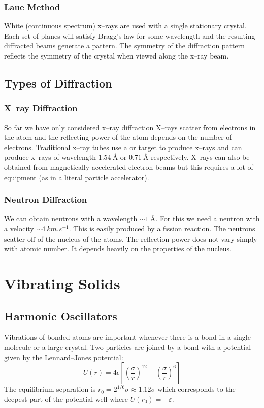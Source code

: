     \subsubsection{Laue Method}
    White (continuous spectrum) x--rays are used with a single stationary crystal.
    Each set of planes will satisfy Bragg's law for some wavelength and the resulting diffracted beams generate a pattern.
    The symmetry of the diffraction pattern reflects the symmetry of the crystal when viewed along the x--ray beam.
    
    \subsection{Types of Diffraction}
    \subsubsection{X--ray Diffraction}
    So far we have only considered x--ray diffraction
    X--rays scatter from electrons in the atom and the reflecting power of the atom depends on the number of electrons.
    Traditional x--ray tubes use a  or  target to produce x--rays and can produce x--rays of wavelength \(\SI{1.54}{\angstrom}\) or \(\SI{0.71}{\angstrom}\) respectively.
    X--rays can also be obtained from magnetically accelerated electron beams but this requires a lot of equipment (as in a literal particle accelerator).
    
    \subsubsection{Neutron Diffraction}
    We can obtain neutrons with a wavelength \(\sim\SI{1}{\angstrom}\).
    For this we need a neutron with a velocity \(\sim\SI{4}{km.s^{-1}}\).
    This is easily produced by a fission reaction.
    The neutrons scatter off of the nucleus of the atoms.
    The reflection power does not vary simply with atomic number.
    It depends heavily on the properties of the nucleus.
    
    \section{Vibrating Solids}
    \subsection{Harmonic Oscillators}\label{sec:harmonic oscillators}
    Vibrations of bonded atoms are important whenever there is a bond in a single molecule or a large crystal.
    Two particles are joined by a bond with a potential given by the Lennard--Jones potential:
    \[U(r) = 4\epsilon\left[\left(\frac{\sigma}{r}\right)^{12} - \left(\frac{\sigma}{r}\right)^6\right]\]
    The equilibrium separation is \(r_0 = 2^{1/6}\sigma \approx 1.12\sigma\) which corresponds to the deepest part of the potential well where \(U(r_0) = -\varepsilon\).
    
